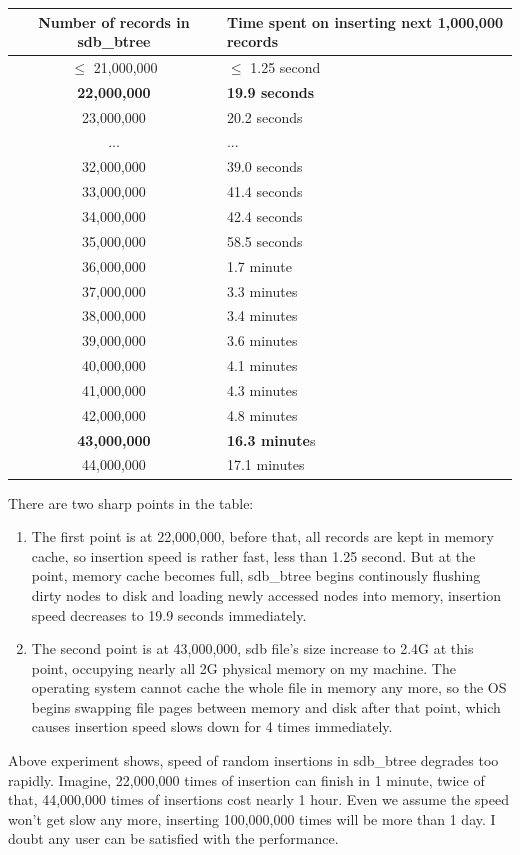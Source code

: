 \documentclass[a4paper,10pt]{article}
\begin{document}
\begin{table}[H]\centering
\begin{tabular}[t]{c|p{8cm}}
     \toprule
     Number of records in sdb\_btree & Time spent on inserting next 1,000,000 records\\
     \midrule
     $\leq$ 21,000,000 & $\leq$ 1.25 second \\
     \textbf{22,000,000} & \textbf{19.9 seconds} \\
     23,000,000 & 20.2 seconds \\
     ...        & ...  \\
     32,000,000 & 39.0 seconds\\
     33,000,000 & 41.4 seconds\\
     34,000,000 & 42.4 seconds\\
     35,000,000 & 58.5 seconds\\
     36,000,000 & 1.7 minute \\
     37,000,000 & 3.3 minutes \\
     38,000,000 & 3.4 minutes \\
     39,000,000 & 3.6 minutes \\
     40,000,000 & 4.1 minutes \\
     41,000,000 & 4.3 minutes \\
     42,000,000 & 4.8 minutes \\
     \textbf{43,000,000} & \textbf{16.3 minute}s \\
     44,000,000 & 17.1 minutes \\
     \bottomrule
\end{tabular}
\end{table}

There are two sharp points in the table:
\begin{enumerate}
\item The first point is at 22,000,000, before that, all records are kept in memory cache, so insertion speed is rather fast, less than 1.25 second.
But at the point, memory cache becomes full, sdb\_btree begins continously flushing dirty nodes to disk and loading newly accessed nodes into memory, insertion speed decreases to 19.9 seconds immediately.
\item The second point is at 43,000,000, sdb file's size increase to 2.4G at this point, occupying nearly all 2G physical memory on my machine. The operating system cannot cache the whole file in memory any more,
so the OS begins swapping file pages between memory and disk after that point, which causes insertion speed slows down for 4 times immediately.
\end{enumerate}
Above experiment shows, speed of random insertions in sdb\_btree degrades too rapidly. Imagine, 22,000,000 times of insertion can finish in 1 minute, twice of that, 44,000,000 times of insertions cost nearly 1 hour.
Even we assume the speed won't get slow any more, inserting 100,000,000 times will be more than 1 day. I doubt any user can be satisfied with the performance.
\end{document}
